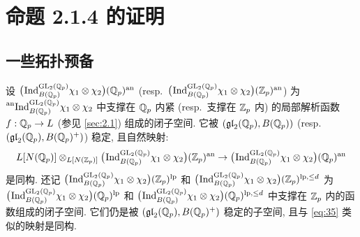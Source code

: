 
\appendix
\section{命题 2.1.4 的证明}

\subsection{一些拓扑预备}\label{sec:A.1}

设 $\bigl(\pind{}_{B(\Qp)}^{\GL_2(\Qp)} \chi_1 \otimes \chi_2\bigr)(\Qp)^{\mathrm{an}}$ (resp.\ $\bigl(\pind{}_{B(\Qp)}^{\GL_2(\Qp)} \chi_1 \otimes \chi_2\bigr)(\Zp)^{\mathrm{an}}$) 为 $\anind_{B(\Qp)}^{\GL_2(\Qp)} \chi_1 \otimes \chi_2$ 中支撑在 $\Qp$ 内紧 (resp.\ 支撑在 $\Zp$ 内) 的局部解析函数 $f : \Qp \to L$ (参见 \ref{sec:2.1}) 组成的闭子空间.
它被 $(\mathfrak{gl}_2(\Qp),B(\Qp))$ (resp.\ $(\mathfrak{gl}_2(\Qp),B(\Qp)^{+})$) 稳定, 且自然映射:
\begin{equation}
\label{eq:35}
L[N(\Qp)] \otimes_{L[N(\Zp)]} \bigl(\pind{}_{B(\Qp)}^{\GL_2(\Qp)} \chi_1 \otimes \chi_2\bigr)(\Zp)^{\mathrm{an}}
\to \bigl(\pind{}_{B(\Qp)}^{\GL_2(\Qp)} \chi_1 \otimes \chi_2\bigr)(\Qp)^{\mathrm{an}}
\end{equation}
是同构.
还记 $\bigl(\pind{}_{B(\Qp)}^{\GL_2(\Qp)} \chi_1 \otimes \chi_2\bigr)(\Zp)^{\mathrm{lp}}$ 和 $\bigl(\pind{}_{B(\Qp)}^{\GL_2(\Qp)} \chi_1 \otimes \chi_2\bigr)(\Zp)^{\mathrm{lp},\le d}$ 为 $\bigl(\pind{}_{B(\Qp)}^{\GL_2(\Qp)} \chi_1 \otimes \chi_2\bigr)(\Qp)^{\mathrm{lp}}$ 和 $\bigl(\pind{}_{B(\Qp)}^{\GL_2(\Qp)} \chi_1 \otimes \chi_2\bigr)(\Qp)^{\mathrm{lp},\le d}$ 中支撑在 $\Zp$ 内的函数组成的闭子空间.
它们仍是被 $(\mathfrak{gl}_2(\Qp),B(\Qp)^{+})$ 稳定的子空间, 且与 \eqref{eq:35} 类似的映射是同构.

